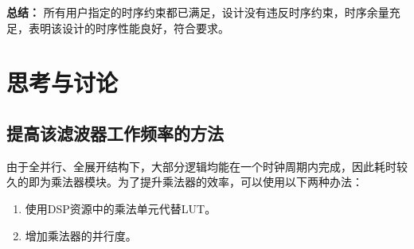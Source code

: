 \textbf{总结：}  
所有用户指定的时序约束都已满足，设计没有违反时序约束，时序余量充足，表明该设计的时序性能良好，符合要求。

\section{思考与讨论}
\subsection{提高该滤波器工作频率的方法}

由于全并行、全展开结构下，大部分逻辑均能在一个时钟周期内完成，因此耗时较久的即为乘法器模块。为了提升乘法器的效率，可以使用以下两种办法：
\begin{enumerate}
  \item 使用DSP资源中的乘法单元代替LUT。
  \item 增加乘法器的并行度。
\end{enumerate}
